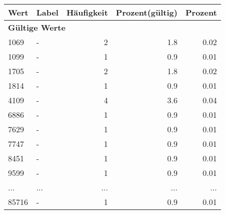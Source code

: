      \begin{longtable}{lXrrr}
     \toprule
     \textbf{Wert} & \textbf{Label} & \textbf{Häufigkeit} & \textbf{Prozent(gültig)} & \textbf{Prozent} \\
     \endhead
     \midrule
     \multicolumn{5}{l}{\textbf{Gültige Werte}}\\
        1069 & \multicolumn{1}{X}{-} & %
          \num{2} &
          \num[round-mode=places,round-precision=2]{1.8} &
          \num[round-mode=places,round-precision=2]{0.02} \\
        1099 & \multicolumn{1}{X}{-} & %
          \num{1} &
          \num[round-mode=places,round-precision=2]{0.9} &
          \num[round-mode=places,round-precision=2]{0.01} \\
        1705 & \multicolumn{1}{X}{-} & %
          \num{2} &
          \num[round-mode=places,round-precision=2]{1.8} &
          \num[round-mode=places,round-precision=2]{0.02} \\
        1814 & \multicolumn{1}{X}{-} & %
          \num{1} &
          \num[round-mode=places,round-precision=2]{0.9} &
          \num[round-mode=places,round-precision=2]{0.01} \\
        4109 & \multicolumn{1}{X}{-} & %
          \num{4} &
          \num[round-mode=places,round-precision=2]{3.6} &
          \num[round-mode=places,round-precision=2]{0.04} \\
        6886 & \multicolumn{1}{X}{-} & %
          \num{1} &
          \num[round-mode=places,round-precision=2]{0.9} &
          \num[round-mode=places,round-precision=2]{0.01} \\
        7629 & \multicolumn{1}{X}{-} & %
          \num{1} &
          \num[round-mode=places,round-precision=2]{0.9} &
          \num[round-mode=places,round-precision=2]{0.01} \\
        7747 & \multicolumn{1}{X}{-} & %
          \num{1} &
          \num[round-mode=places,round-precision=2]{0.9} &
          \num[round-mode=places,round-precision=2]{0.01} \\
        8451 & \multicolumn{1}{X}{-} & %
          \num{1} &
          \num[round-mode=places,round-precision=2]{0.9} &
          \num[round-mode=places,round-precision=2]{0.01} \\
        9599 & \multicolumn{1}{X}{-} & %
          \num{1} &
          \num[round-mode=places,round-precision=2]{0.9} &
          \num[round-mode=places,round-precision=2]{0.01} \\
       ... & ... & ... & ... & ... \\
        85716 & \multicolumn{1}{X}{-} & %
          \num{1} &
          \num[round-mode=places,round-precision=2]{0.9} &
          \num[round-mode=places,round-precision=2]{0.01} \\


\end{longtable}
